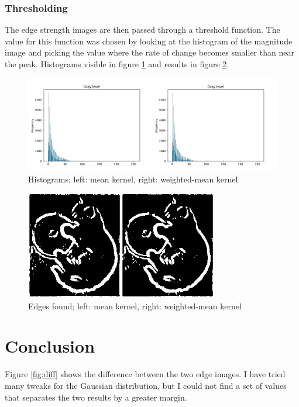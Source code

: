 \documentclass[12pt,a4paper]{article}
\begin{document}
\subsubsection*{Thresholding}

The edge strength images are then passed through a threshold function. The value for this function was chosen by looking at the histogram of the magnitude image and picking the value where the rate of change becomes smaller than near the peak. Histograms visible in  figure \ref{fig:hist} and results in figure \ref{fig:edge}.

\begin{figure}[ht]
    \centering
    \includegraphics[width=1\textwidth]{hist}
    \caption{Histograms; left: mean kernel, right: weighted-mean kernel}
    \label{fig:hist}
\end{figure}

\begin{figure}[ht]
    \centering
    \includegraphics[width=0.75\textwidth]{edge}
    \caption{Edges found; left: mean kernel, right: weighted-mean kernel}
    \label{fig:edge}
\end{figure}

\section*{Conclusion}

Figure \ref{fig:diff} shows the difference between the two edge images. I have tried many tweaks for the Gaussian distribution, but I could not find a set of values that separates the two results by a greater margin.
\end{document}
